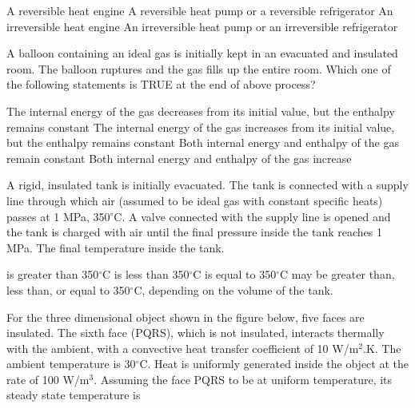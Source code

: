 \documentclass[addpoints,11pt]{exam}
\begin{document}
\begin{questions}
        \begin{choices}
            \choice A reversible heat engine
            \choice A reversible heat pump or a reversible refrigerator
            \choice An irreversible heat engine
            \choice An irreversible heat pump or an irreversible refrigerator
        \end{choices}

        \question A balloon containing an ideal gas is initially kept in an evacuated and insulated room. The balloon ruptures and the gas fills up the entire room. Which one of the following statements is TRUE at the end of above process?

        \begin{choices}
            \choice The internal energy of the gas decreases from its initial value, but the enthalpy remains constant
            \choice The internal energy of the gas increases from its initial value, but the enthalpy remains constant
            \choice Both internal energy and enthalpy of the gas remain constant
            \choice Both internal energy and enthalpy of the gas increase
        \end{choices}

        \question A rigid, insulated tank is initially evacuated. The tank is connected with a supply line through which air (assumed to be ideal gas with constant specific heats) passes at 1 MPa, 350$^\circ$C. A valve connected with the supply line is opened and the tank is charged with air until the final pressure inside the tank reaches 1 MPa. The final temperature inside the tank.%

        \begin{choices}
            \choice is greater than 350$^\circ$C
            \choice is less than 350$^\circ$C
            \choice is equal to 350$^\circ$C
            \choice may be greater than, less than, or equal to 350$^\circ$C, depending on the volume of the tank.
        \end{choices}

        \question For the three dimensional object shown in the figure below, five faces are insulated. The sixth face (PQRS), which is not insulated, interacts thermally with the ambient, with a convective heat transfer coefficient of 10 W/m$^2$.K. The ambient temperature is 30$^\circ$C. Heat is uniformly generated inside the object at the rate of 100 W/m$^3$. Assuming the face PQRS to be at uniform temperature, its steady state temperature is%


\end{questions}
\end{document}
